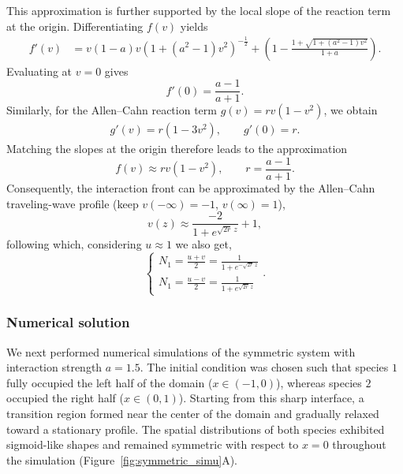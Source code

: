This approximation is further supported by the local slope of the reaction term at the origin. Differentiating $f(v)$ yields
\begin{align*}
    f'(v)
    &=
    v(1-a)v
    \left(
        1+(a^2-1)v^2
    \right)^{-\frac{1}{2}}
    +
    \left(
        1
        -
        \frac{1+\sqrt{1+(a^2-1)v^2}}{1+a}
    \right).
\end{align*}
Evaluating at $v=0$ gives
\begin{equation*}
    f'(0)=\frac{a-1}{a+1}.
\end{equation*}
Similarly, for the Allen--Cahn reaction term $g(v)=rv(1-v^2)$,
we obtain
\begin{align*}
    g'(v)=r(1-3v^2), \qquad
    g'(0)=r.
\end{align*}
Matching the slopes at the origin therefore leads to the approximation
\begin{equation}\label{eqn:r_approx}
    f(v)\approx rv(1-v^2),
    \qquad
    r=\frac{a-1}{a+1}.
\end{equation}
Consequently, the interaction front can be approximated by the Allen--Cahn traveling-wave profile (keep $v(-\infty) = -1$, $v(\infty) = 1$),
\begin{equation}
    v(z)
    \approx
    \frac{-2}{1+e^{\sqrt{2r}\,z}} + 1,
\end{equation}
following which, considering $u \approx 1$ we also get,
\begin{equation*}
    \begin{cases}
        N_1 = \frac{u+v}{2} = \frac{1}{1+e^{-\sqrt{2r}\,z}}\\
        N_1 = \frac{u-v}{2} = \frac{1}{1+e^{\sqrt{2r}\,z}}
    \end{cases}.
\end{equation*}

\subsubsection{Numerical solution}

We next performed numerical simulations of the symmetric system with interaction strength $a=1.5$. The initial condition was chosen such that species $1$ fully occupied the left half of the domain ($x\in(-1,0)$), whereas species $2$ occupied the right half ($x\in(0,1)$). Starting from this sharp interface, a transition region formed near the center of the domain and gradually relaxed toward a stationary profile. The spatial distributions of both species exhibited sigmoid-like shapes and remained symmetric with respect to $x=0$ throughout the simulation (Figure~\ref{fig:symmetric_simu}A).

